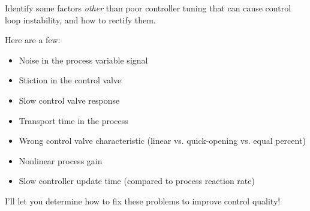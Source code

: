 

Identify some factors {\it other} than poor controller tuning that can cause control loop instability, and how to rectify them.







Here are a few:

\begin{itemize}
\item{} Noise in the process variable signal
\item{} Stiction in the control valve
\item{} Slow control valve response
\item{} Transport time in the process
\item{} Wrong control valve characteristic (linear vs. quick-opening vs. equal percent)
\item{} Nonlinear process gain
\item{} Slow controller update time (compared to process reaction rate)
\end{itemize}

I'll let you determine how to fix these problems to improve control quality!











